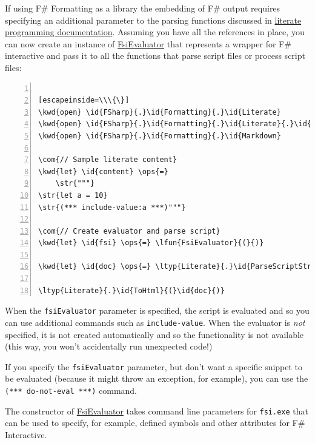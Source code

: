 \documentclass{article}
\newcommand{\id}[1]{\textcolor{black}{#1}}
\newcommand{\com}[1]{\textcolor{officegreen}{#1}}
\newcommand{\kwd}[1]{\textcolor{navy}{#1}}
\newcommand{\ops}[1]{\textcolor{purple}{#1}}
\newcommand{\str}[1]{\textcolor{olive}{#1}}
\begin{document}
If using F\# Formatting as a library the embedding of F\# output requires specifying an additional parameter to the
parsing functions discussed in \href{literate.html}{literate programming documentation}.
Assuming you have all the references in place, you can now create an instance of
\href{https://fsprojects.github.io/FSharp.Formatting/reference/fsharp-formatting-literate-evaluation-fsievaluator.html}{FsiEvaluator} that represents a wrapper for F\# interactive and pass it to all the
functions that parse script files or process script files:
\begin{lstlisting}[numbers=left]

[escapeinside=\\\{\}]
\kwd{open} \id{FSharp}{.}\id{Formatting}{.}\id{Literate}
\kwd{open} \id{FSharp}{.}\id{Formatting}{.}\id{Literate}{.}\id{Evaluation}
\kwd{open} \id{FSharp}{.}\id{Formatting}{.}\id{Markdown}

\com{// Sample literate content}
\kwd{let} \id{content} \ops{=}
    \str{"""}
\str{let a = 10}
\str{(*** include-value:a ***)"""}

\com{// Create evaluator and parse script}
\kwd{let} \id{fsi} \ops{=} \lfun{FsiEvaluator}{(}{)}

\kwd{let} \id{doc} \ops{=} \ltyp{Literate}{.}\id{ParseScriptString}{(}\id{content}{,} \lfun{fsiEvaluator} \ops{=} \id{fsi}{)}

\ltyp{Literate}{.}\id{ToHtml}{(}\id{doc}{)}

\end{lstlisting}



When the \texttt{fsiEvaluator} parameter is specified, the script is evaluated and so you
can use additional commands such as \texttt{include-value}. When the evaluator is \emph{not} specified,
it is not created automatically and so the functionality is not available (this way,
you won't accidentally run unexpected code!)


If you specify the \texttt{fsiEvaluator} parameter, but don't want a specific snippet to be evaluated
(because it might throw an exception, for example), you can use the \texttt{(*** do-not-eval ***)}
command.


The constructor of \href{https://fsprojects.github.io/FSharp.Formatting/reference/fsharp-formatting-literate-evaluation-fsievaluator.html}{FsiEvaluator} takes command line parameters for \texttt{fsi.exe} that can
be used to specify, for example, defined symbols and other attributes for F\# Interactive.
\end{document}

